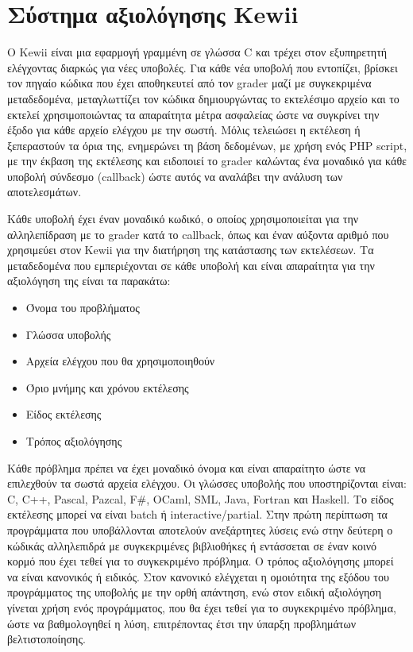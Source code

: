 \documentclass[diploma]{softlab-thesis}
\begin{document}
\section{Σύστημα αξιολόγησης Kewii}

Ο Kewii είναι μια εφαρμογή γραμμένη σε γλώσσα C και τρέχει στον εξυπηρετητή
ελέγχοντας διαρκώς για νέες υποβολές. Για κάθε νέα υποβολή που εντοπίζει,
βρίσκει τον πηγαίο κώδικα που έχει αποθηκευτεί από τον grader μαζί με συγκεκριμένα
μεταδεδομένα, μεταγλωττίζει τον κώδικα δημιουργώντας το εκτελέσιμο αρχείο και το
εκτελεί χρησιμοποιώντας τα απαραίτητα μέτρα ασφαλείας ώστε να συγκρίνει την έξοδο
για κάθε αρχείο ελέγχου με την σωστή. Μόλις τελειώσει η εκτέλεση ή ξεπεραστούν τα
όρια της, ενημερώνει τη βάση δεδομένων, με χρήση ενός PHP script, με την έκβαση της
εκτέλεσης και ειδοποιεί το grader καλώντας ένα μοναδικό για κάθε υποβολή σύνδεσμο
(callback) ώστε αυτός να αναλάβει την ανάλυση των αποτελεσμάτων.

\bigskip

Κάθε υποβολή έχει έναν μοναδικό κωδικό, ο οποίος χρησιμοποιείται για την
αλληλεπίδραση με το grader κατά το callback, όπως και έναν αύξοντα αριθμό που
χρησιμεύει στον Kewii για την διατήρηση της κατάστασης των εκτελέσεων. Τα
μεταδεδομένα που εμπεριέχονται σε κάθε υποβολή και είναι απαραίτητα για την
αξιολόγηση της είναι τα παρακάτω:

\begin{itemize}
  \item Όνομα του προβλήματος
  \item Γλώσσα υποβολής
  \item Αρχεία ελέγχου που θα χρησιμοποιηθούν
  \item Όριο μνήμης και χρόνου εκτέλεσης
  \item Είδος εκτέλεσης
  \item Τρόπος αξιολόγησης
\end{itemize}

Κάθε πρόβλημα πρέπει να έχει μοναδικό όνομα και είναι απαραίτητο ώστε να
επιλεχθούν τα σωστά αρχεία ελέγχου. Οι γλώσσες υποβολής που υποστηρίζονται
είναι: C, C++, Pascal, Pazcal, F\#, OCaml, SML, Java, Fortran και Haskell. Το
είδος εκτέλεσης μπορεί να είναι batch ή interactive/partial. Στην πρώτη
περίπτωση τα προγράμματα που υποβάλλονται αποτελούν ανεξάρτητες λύσεις ενώ στην
δεύτερη ο κώδικάς αλληλεπιδρά με συγκεκριμένες βιβλιοθήκες ή εντάσσεται σε έναν
κοινό κορμό που έχει τεθεί για το συγκεκριμένο πρόβλημα. Ο τρόπος αξιολόγησης
μπορεί να είναι κανονικός ή ειδικός. Στον κανονικό ελέγχεται η ομοιότητα της
εξόδου του προγράμματος της υποβολής με την ορθή απάντηση, ενώ στον ειδική
αξιολόγηση γίνεται χρήση ενός προγράμματος, που θα έχει τεθεί για το
συγκεκριμένο πρόβλημα, ώστε να βαθμολογηθεί η λύση, επιτρέποντας έτσι την
ύπαρξη προβλημάτων βελτιστοποίησης.
\end{document}
